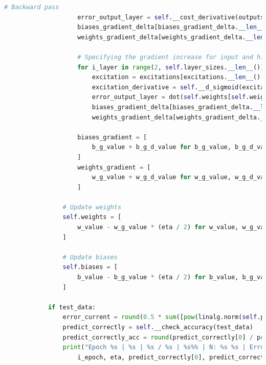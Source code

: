 \documentclass[12pt,twoside]{article}
\begin{document}
\begin{lstlisting}[caption={Plik klasy Network - network.py},label={Lst:network_py},language=Python,basicstyle=\scriptsize]
                    # Backward pass
                    error_output_layer = self.__cost_derivative(outputs[outputs.__len__() - 1], mini_batch[i_record][1]) * self.__d_sigmoid(excitations[excitations.__len__() - 1])
                    biases_gradient_delta[biases_gradient_delta.__len__() - 1] = error_output_layer
                    weights_gradient_delta[weights_gradient_delta.__len__() - 1] = dot(error_output_layer, outputs[outputs.__len__() - 2].transpose())

                    # Specifying the gradient increase for input and hidden layers
                    for i_layer in range(2, self.layer_sizes.__len__()):
                        excitation = excitations[excitations.__len__() - i_layer]
                        excitation_derivative = self.__d_sigmoid(excitation)
                        error_output_layer = dot(self.weights[self.weights.__len__() - i_layer + 1].transpose(), error_output_layer) * excitation_derivative
                        biases_gradient_delta[biases_gradient_delta.__len__() - i_layer] = error_output_layer
                        weights_gradient_delta[weights_gradient_delta.__len__() - i_layer] = dot(error_output_layer, outputs[outputs.__len__() - i_layer - 1].transpose())

                    biases_gradient = [
                        b_g_value + b_g_d_value for b_g_value, b_g_d_value in zip(biases_gradient, biases_gradient_delta)
                    ]
                    weights_gradient = [
                        w_g_value + w_g_d_value for w_g_value, w_g_d_value in zip(weights_gradient, weights_gradient_delta)
                    ]

                # Update weights
                self.weights = [
                    w_value - w_g_value * (eta / 2) for w_value, w_g_value in zip(self.weights, weights_gradient)
                ]

                # Update biases
                self.biases = [
                    b_value - b_g_value * (eta / 2) for b_value, b_g_value in zip(self.biases, biases_gradient)
                ]

            if test_data:
                error_current = round(0.5 * sum([pow(linalg.norm(self.predict(x) - y), 2) for (x, y) in test_data]), 6)
                predict_correctly = self.__check_accuracy(test_data)
                predict_correctly_acc = round(predict_correctly[0] / predict_correctly[1] * 100, 2)
                print("Epoch %s | %s | %s / %s | %s%% | N: %s %s | Error %s | mb: %s" % (
                    i_epoch, eta, predict_correctly[0], predict_correctly[1], predict_correctly_acc, self.layer_sizes[1], self.layer_sizes[2], error_current, mini_batch_size))


\end{lstlisting}
\end{document}
